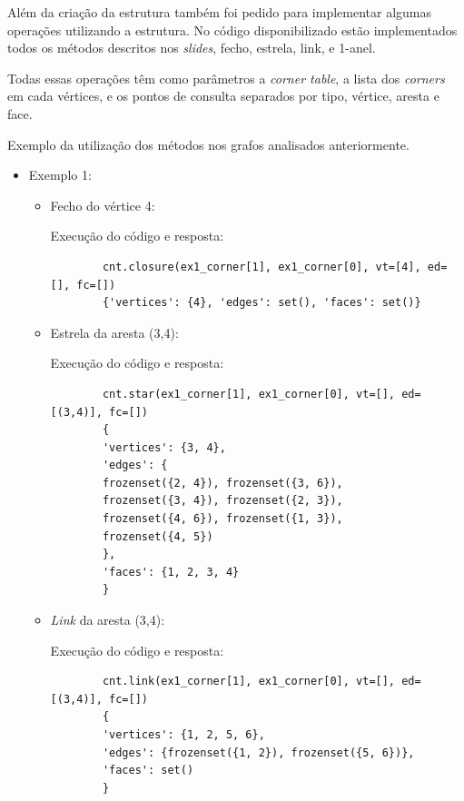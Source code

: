 \documentclass[a4paper]{article}
\begin{document}
 
 Além da criação da estrutura também foi pedido para implementar algumas operações utilizando a estrutura.
 No código disponibilizado estão implementados todos os métodos descritos nos \textit{slides}, fecho, estrela, link, e 1-anel.

 Todas essas operações têm como parâmetros a \textit{corner table}, a lista dos \textit{corners} em cada vértices, e os pontos de consulta separados por tipo, vértice, aresta e face.
 
Exemplo da utilização dos métodos nos grafos analisados anteriormente.


\begin{itemize}
	\item Exemplo 1:
	\begin{itemize}
		\item Fecho do vértice 4:
		
		Execução do código e resposta:
		\begin{verbatim}
		cnt.closure(ex1_corner[1], ex1_corner[0], vt=[4], ed=[], fc=[])
		{'vertices': {4}, 'edges': set(), 'faces': set()}
		\end{verbatim}
		
		\item Estrela da aresta (3,4):
		
		Execução do código e resposta:
		\begin{verbatim}
		cnt.star(ex1_corner[1], ex1_corner[0], vt=[], ed=[(3,4)], fc=[])
		{
		'vertices': {3, 4}, 
		'edges': {
		frozenset({2, 4}), frozenset({3, 6}), 
		frozenset({3, 4}), frozenset({2, 3}), 
		frozenset({4, 6}), frozenset({1, 3}), 
		frozenset({4, 5})
		}, 
		'faces': {1, 2, 3, 4}
		}
		\end{verbatim}
		
		\item \textit{Link} da aresta (3,4):
		
		Execução do código e resposta:
		\begin{verbatim}
		cnt.link(ex1_corner[1], ex1_corner[0], vt=[], ed=[(3,4)], fc=[])
		{
		'vertices': {1, 2, 5, 6}, 
		'edges': {frozenset({1, 2}), frozenset({5, 6})}, 
		'faces': set()
		}
		\end{verbatim}
		
	\end{itemize}
	
	
	

\end{itemize}
\end{document}

